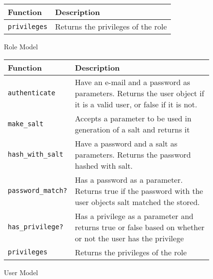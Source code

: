 \begin{figure}[htb]
\begin{center}
\begin{tabular}{ | l | p{8cm} | }
  \hline
    \textbf{Function} & \textbf{Description} \\ \hline
    \verb+privileges+ & Returns the privileges of the role \\ \hline
\end{tabular}
\caption{Role Model}
\label{tab:role_model_functions}
\end{center}
\end{figure}

\begin{figure}[htb]
\begin{center}
\begin{tabular}{ | l | p{8cm} | }
  \hline
    \textbf{Function} & \textbf{Description} \\ \hline
    \verb+authenticate+ & Have an e-mail and a password as parameters. Returns the user object if it is a valid user, or false if it is not. \\ \hline
    \verb+make_salt+ & Accepts a parameter to be used in generation of a salt and returns it \\ \hline
    \verb+hash_with_salt+ & Have a password and a salt as parameters. Returns the password hashed with salt.  \\ \hline
    \verb+password_match?+ & Has a password as a parameter. Returns true if the password with the user objects salt matched the stored. \\ \hline
    \verb+has_privilege?+ & Has a privilege as a parameter and returns true or false based on whether or not the user has the privilege \\ \hline
    \verb+privileges+ & Returns the privileges of the role \\ \hline
\end{tabular}
\caption{User Model}
\label{tab:user_model_functions}
\end{center}
\end{figure}